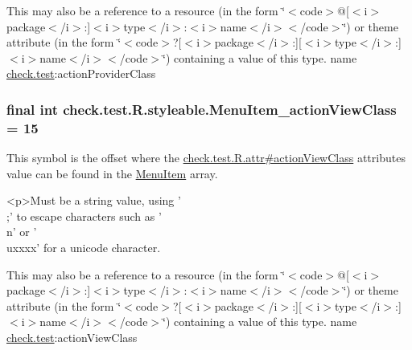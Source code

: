 This may also be a reference to a resource (in the form \char`\"{}$<$code$>$@\mbox{[}$<$i$>$package$<$/i$>$\+:\mbox{]}$<$i$>$type$<$/i$>$\+:$<$i$>$name$<$/i$>$$<$/code$>$\char`\"{}) or theme attribute (in the form \char`\"{}$<$code$>$?\mbox{[}$<$i$>$package$<$/i$>$\+:\mbox{]}\mbox{[}$<$i$>$type$<$/i$>$\+:\mbox{]}$<$i$>$name$<$/i$>$$<$/code$>$\char`\"{}) containing a value of this type.  name \hyperlink{namespacecheck_1_1test}{check.\+test}\+:action\+Provider\+Class \hypertarget{classcheck_1_1test_1_1_r_1_1styleable_a66bbe255e93d07b1c2d98af7b85bcf37}{}
\subsubsection[{Menu\+Item\+\_\+action\+View\+Class}]{\setlength{\rightskip}{0pt plus 5cm}final int check.\+test.\+R.\+styleable.\+Menu\+Item\+\_\+action\+View\+Class = 15\hspace{0.3cm}{\ttfamily [static]}}\label{classcheck_1_1test_1_1_r_1_1styleable_a66bbe255e93d07b1c2d98af7b85bcf37}
This symbol is the offset where the \hyperlink{classcheck_1_1test_1_1_r_1_1attr_aabc7490f827174f67e409de2dd06c2cb}{check.\+test.\+R.\+attr\#action\+View\+Class} attribute\textquotesingle{}s value can be found in the \hyperlink{classcheck_1_1test_1_1_r_1_1styleable_af26376072eab01d1b4197e48992dc936}{Menu\+Item} array.

\begin{DoxyVerb}      <p>Must be a string value, using '\\;' to escape characters such as '\\n' or '\\uxxxx' for a unicode character.
\end{DoxyVerb}
 

This may also be a reference to a resource (in the form \char`\"{}$<$code$>$@\mbox{[}$<$i$>$package$<$/i$>$\+:\mbox{]}$<$i$>$type$<$/i$>$\+:$<$i$>$name$<$/i$>$$<$/code$>$\char`\"{}) or theme attribute (in the form \char`\"{}$<$code$>$?\mbox{[}$<$i$>$package$<$/i$>$\+:\mbox{]}\mbox{[}$<$i$>$type$<$/i$>$\+:\mbox{]}$<$i$>$name$<$/i$>$$<$/code$>$\char`\"{}) containing a value of this type.  name \hyperlink{namespacecheck_1_1test}{check.\+test}\+:action\+View\+Class \hypertarget{classcheck_1_1test_1_1_r_1_1styleable_a787aabf6b90e6e64c272388b5702e917}{}
